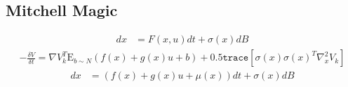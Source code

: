 \documentclass[a4paper]{article}
\begin{document}
  \subsection{Mitchell Magic}

  \begin{align*}
  dx &= F(x,u) dt + \sigma(x) dB
  \end{align*}
  \begin{align*}
  -\frac{\delta V}{\delta t} = \nabla V_k^T \mathrm{E}_{b\sim N} ( f(x) + g(x) u + b ) + 0.5 \texttt{trace} [\sigma(x) \sigma(x)^T \nabla^2_x V_k]
  \end{align*}
  \begin{align*}
  dx &= (f(x) + g(x) u + \mu(x) ) dt + \sigma(x) dB
  \end{align*}
\end{document}
